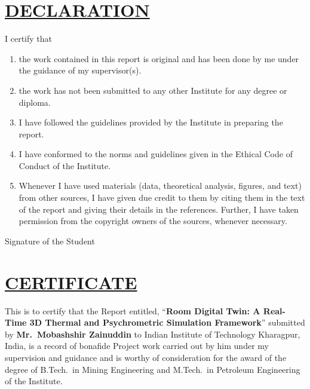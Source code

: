 \documentclass[12pt,a4paper]{report}
\begin{document}
\chapter*{\underline{DECLARATION}}

I certify that

\begin{enumerate}[label=\alph*.]
  \item the work contained in this report is original and has been done by me under the guidance of my supervisor(s).
  \item the work has not been submitted to any other Institute for any degree or diploma.
  \item I have followed the guidelines provided by the Institute in preparing the report.
  \item I have conformed to the norms and guidelines given in the Ethical Code of Conduct of the Institute.
  \item Whenever I have used materials (data, theoretical analysis, figures, and text) from other sources, I have given due credit to them by citing them in the text of the report and giving their details in the references. Further, I have taken permission from the copyright owners of the sources, whenever necessary.
\end{enumerate}

\vspace{3cm}
\hfill Signature of the Student

\newpage

\thispagestyle{plain}
\chapter*{\underline{CERTIFICATE}}

\vspace{1cm}
\noindent This is to certify that the Report entitled, ``\textbf{Room Digital Twin: A Real-Time 3D Thermal and Psychrometric Simulation Framework}'' submitted by \textbf{Mr.\ Mobashshir Zainuddin} to Indian Institute of Technology Kharagpur, India, is a record of bonafide Project work carried out by him under my supervision and guidance and is worthy of consideration for the award of the degree of B.Tech.\ in Mining Engineering and M.Tech.\ in Petroleum Engineering of the Institute.
\end{document}
